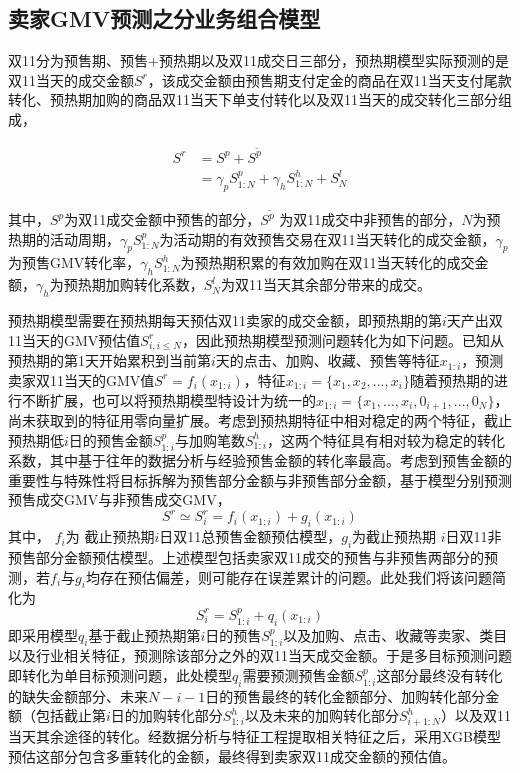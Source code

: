 \subsection{卖家GMV预测之分业务组合模型}

双11分为预售期、预售+预热期以及双11成交日三部分，预热期模型实际预测的是双11当天的成交金额$ S^r$，该成交金额由预售期支付定金的商品在双11当天支付尾款转化、预热期加购的商品双11当天下单支付转化以及双11当天的成交转化三部分组成，

\begin{align}
S^r &= S^p+S^{\tilde p} \\
&= \gamma_pS_{1:N}^p+\gamma_hS_{1:N}^h+S_N^l
\end{align}

其中，$S^p$为双11成交金额中预售的部分，$S^{\tilde p}$ 为双11成交中非预售的部分，$N$为预热期的活动周期，$ \gamma_pS_{1:N}^p$为活动期的有效预售交易在双11当天转化的成交金额，$\gamma_p$为预售GMV转化率，$\gamma_hS_{1:N}^h$为预热期积累的有效加购在双11当天转化的成交金额，$\gamma_h$为预热期加购转化系数，$S_N^l$为双11当天其余部分带来的成交。

预热期模型需要在预热期每天预估双11卖家的成交金额，即预热期的第$i$天产出双11当天的GMV预估值$S_{i,i \le N}^r$，因此预热期模型预测问题转化为如下问题。已知从预热期的第1天开始累积到当前第$i$天的点击、加购、收藏、预售等特征$x_{1:i}$，预测卖家双11当天的GMV值$S^r = f_i(x_{1:i})$，特征$x_{1:i}=\{ x_1, x_2,...,x_i \}$随着预热期的进行不断扩展，也可以将预热期模型特设计为统一的$x_{1:i}= \{ x_1,...,x_i,0_{i+1},...,0_{N} \}$，尚未获取到的特征用零向量扩展。考虑到预热期特征中相对稳定的两个特征，截止预热期低$i$日的预售金额$S_{1:i}^p$与加购笔数$S_{1:i}^h$，这两个特征具有相对较为稳定的转化系数，其中基于往年的数据分析与经验预售金额的转化率最高。考虑到预售金额的重要性与特殊性将目标拆解为预售部分金额与非预售部分金额，基于模型分别预测预售成交GMV与非预售成交GMV，
$$ S^r \simeq S^r_i=f_i(x_{1:i})+g_i(x_{1:i}) $$
其中， $ f_i$为 截止预热期$ i$日双11总预售金额预估模型，$ g_i$为截止预热期 $ i$日双11非预售部分金额预估模型。上述模型包括卖家双11成交的预售与非预售两部分的预测，若$f_i$与$g_i$均存在预估偏差，则可能存在误差累计的问题。此处我们将该问题简化为
$$  S^r_i=S_{1:i}^p+q_i(x_{1:i}) $$
即采用模型$q_i$基于截止预热期第$i$日的预售$S_{1:i}^p$以及加购、点击、收藏等卖家、类目以及行业相关特征，预测除该部分之外的双11当天成交金额。于是多目标预测问题即转化为单目标预测问题，此处模型$q_i$需要预测预售金额$S_{1:i}^p$这部分最终没有转化的缺失金额部分、未来$N-i-1$日的预售最终的转化金额部分、加购转化部分金额（包括截止第$i$日的加购转化部分$S_{1:i}^h$以及未来的加购转化部分$S_{i+1:N}^h$）以及双11当天其余途径的转化。经数据分析与特征工程提取相关特征之后，采用XGB模型预估这部分包含多重转化的金额，最终得到卖家双11成交金额的预估值。

